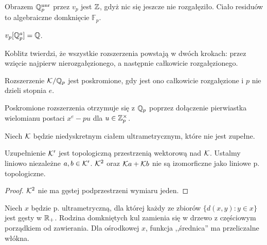 \begin{fakt}
	Obrazem $\mathbb Q_p^{\textrm{unr}}$ przez $v_p$ jest $\mathbb Z$, gdyż nic się jeszcze nie rozgałęziło.
	Ciało residuów to algebraiczne domknięcie $\mathbb F_p$.
\end{fakt}

\begin{fakt}
	$v_p[\mathbb Q_p^a] = \mathbb Q$.
\end{fakt}

Koblitz twierdzi, że wszystkie rozszerzenia powstają w dwóch krokach: przez wzięcie najpierw nierozgałęzionego, a następnie całkowicie rozgałęzionego.

\begin{definicja}
	Rozszerzenie $\mathcal K / \mathbb Q_p$ jest poskromione, gdy jest ono całkowicie rozgałęzione i $p$ nie dzieli stopnia $e$.
\end{definicja}

\begin{fakt}
	Poskromione rozszerzenia otrzymuje się z $\mathbb Q_p$ poprzez dołączenie pierwiastka wielomianu postaci $x^e - pu$ dla $u \in \mathbb Z_p^\times$.
\end{fakt}

\begin{fakt} %
	Niech $\mathcal K$ będzie niedyskretnym ciałem ultrametrycznym, które nie jest zupełne.
	
	Uzupełnienie $\mathcal K'$ jest topologiczną przestrzenią wektorową nad $\mathcal K$.
	Ustalmy liniowo niezależne $a, b \in \mathcal K'$.
	$\mathcal K^2$ oraz $\mathcal K a + \mathcal K b$ nie są izomorficzne jako liniowe p. topologiczne.
\end{fakt}

\begin{proof}
	$\mathcal K^2$ nie ma gęstej podprzestrzeni wymiaru jeden.
\end{proof}

\begin{fakt} %
	Niech $x$ będzie p. ultrametryczną, dla której każdy ze zbiorów $\{d(x,y) : y \in x\}$ jest gęsty w $\mathbb R_+$.
	Rodzina domkniętych kul zamienia się w drzewo z częściowym porządkiem od zawierania.
	Dla ośrodkowej $x$, funkcja ,,średnica'' ma przeliczalne włókna.
\end{fakt}